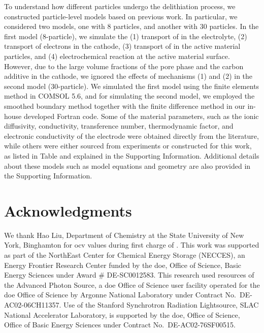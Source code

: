 \documentclass{article}
\begin{document}
To understand how different particles undergo the delithiation
process, we constructed particle-level models based on previous
work. In particular, we considered two models, one with 8 particles,
and another with 30 particles. In the first model (8-particle), we
simulate the (1) transport of  in the electrolyte, (2)
transport of electrons in the cathode, (3) transport of  in
the active material particles, and (4) electrochemical reaction at the
active material surface. However, due to the large volume fractions of
the pore phase and the carbon additive in the cathode, we ignored the
effects of mechanisms (1) and (2) in the second model
(30-particle). We simulated the first model using the finite elements
method in COMSOL 5.6, and for simulating the second model, we employed
the smoothed boundary method \cite{thornton2012} together with the
finite difference method in our in-house developed Fortran code. Some
of the material parameters, such as the ionic diffusivity,
conductivity, transference number, thermodynamic factor, and
electronic conductivity of the \nca{} electrode were obtained directly
from the literature\cite{lindbergh2008,lindbergh2008-2}, while others
were either sourced from experiments or constructed for this work, as
listed in Table  and explained in the
Supporting Information. Additional details about these models such as
model equations and geometry are also provided in the Supporting
Information.


\section*{Acknowledgments}

We thank Hao Liu, Department of Chemistry at the State University of
New York, Binghamton for \gls{ocv} values during first charge of
\nca{}. This work was supported as part of the NorthEast Center for
Chemical Energy Storage (NECCES), an Energy Frontier Research Center
funded by the \gls{doe}, Office of Science, Basic Energy Sciences
under Award \# DE-SC0012583. This research used resources of the
Advanced Photon Source, a \gls{doe} Office of Science user facility
operated for the \gls{doe} Office of Science by Argonne National
Laboratory under Contract No.\ DE-AC02-06CH11357. Use of the Stanford
Synchrotron Radiation Lightsource, SLAC National Accelerator
Laboratory, is supported by the \gls{doe}, Office of Science, Office
of Basic Energy Sciences under Contract No.\ DE-AC02-76SF00515.


\newpage
\end{document}
